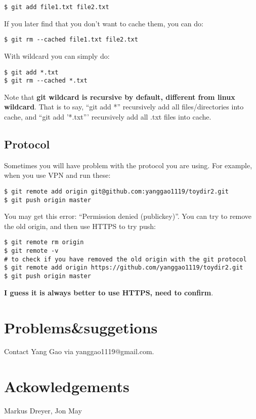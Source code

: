 \documentclass{article} %
\newcommand{\q}[1]{``#1''}
\begin{document}
\begin{lstlisting}
$ git add file1.txt file2.txt
\end{lstlisting}

If you later find that you don't want to cache them, you can do:

\begin{lstlisting}
$ git rm --cached file1.txt file2.txt
\end{lstlisting}

With wildcard you can simply do:

\begin{lstlisting}
$ git add *.txt
$ git rm --cached *.txt
\end{lstlisting}

Note that \textbf{git wildcard is recursive by default, different from linux wildcard}. That is to say, \q{git add *} recursively add all files/directories into cache, and \q{git add '*.txt'} recursively add all .txt files into cache.

\subsection{Protocol}

Sometimes you will have problem with the protocol you are using. For example, when you use VPN and run these:

\begin{lstlisting}
$ git remote add origin git@github.com:yanggao1119/toydir2.git
$ git push origin master
\end{lstlisting}

You may get this error: \q{Permission denied (publickey)}. You can try to remove the old origin, and then use HTTPS to try push:

\begin{lstlisting}
$ git remote rm origin
$ git remote -v 
# to check if you have removed the old origin with the git protocol
$ git remote add origin https://github.com/yanggao1119/toydir2.git
$ git push origin master  
\end{lstlisting}

\textbf{I guess it is always better to use HTTPS, need to confirm}.

\section{Problems\&suggetions}
Contact Yang Gao via yanggao1119@gmail.com.

\section{Ackowledgements}
Markus Dreyer, Jon May
\end{document}
